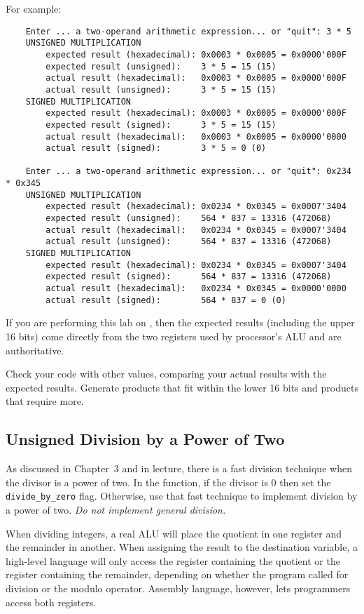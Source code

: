 For example:
\begin{verbatim}
    Enter ... a two-operand arithmetic expression... or "quit": 3 * 5
    UNSIGNED MULTIPLICATION
        expected result (hexadecimal): 0x0003 * 0x0005 = 0x0000'000F
        expected result (unsigned):    3 * 5 = 15 (15)
        actual result (hexadecimal):   0x0003 * 0x0005 = 0x0000'000F
        actual result (unsigned):      3 * 5 = 15 (15)
    SIGNED MULTIPLICATION
        expected result (hexadecimal): 0x0003 * 0x0005 = 0x0000'000F
        expected result (signed):      3 * 5 = 15 (15)
        actual result (hexadecimal):   0x0003 * 0x0005 = 0x0000'0000
        actual result (signed):        3 * 5 = 0 (0)

    Enter ... a two-operand arithmetic expression... or "quit": 0x234 * 0x345
    UNSIGNED MULTIPLICATION
        expected result (hexadecimal): 0x0234 * 0x0345 = 0x0007'3404
        expected result (unsigned):    564 * 837 = 13316 (472068)
        actual result (hexadecimal):   0x0234 * 0x0345 = 0x0007'3404
        actual result (unsigned):      564 * 837 = 13316 (472068)
    SIGNED MULTIPLICATION
        expected result (hexadecimal): 0x0234 * 0x0345 = 0x0007'3404
        expected result (signed):      564 * 837 = 13316 (472068)
        actual result (hexadecimal):   0x0234 * 0x0345 = 0x0000'0000
        actual result (signed):        564 * 837 = 0 (0)
\end{verbatim}

If you are performing this lab on \runtimeenvironment, then the expected results (including the upper 16 bits) come directly from the two registers used by processor's ALU and are authoritative.

Check your code with other values, comparing your actual results with the expected results.
Generate products that fit within the lower 16 bits and products that require more.


\subsection{Unsigned Division by a Power of Two}

As discussed in Chapter~3 and in lecture, there is a fast division technique when the divisor is a power of two.
In the  function, if the divisor is 0 then set the \lstinline{divide_by_zero} flag.
Otherwise, use that fast technique to implement division by a power of two.
\textit{Do not implement general division.}

When dividing integers, a real ALU will place the quotient in one register and the remainder in another.
When assigning the result to the destination variable, a high-level language will only access the register containing the quotient or the register containing the remainder, depending on whether the program called for division or the modulo operator.
Assembly language, however, lets programmers access both registers.

